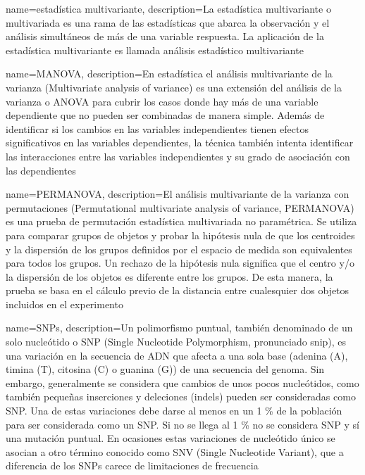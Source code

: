 
\makeglossaries



  {name=estadística multivariante,
   description={La estadística multivariante o multivariada es una rama de las estadísticas que abarca la observación y el análisis simultáneos de más de una variable respuesta. La aplicación de la estadística multivariante es llamada análisis estadístico multivariante}
  }
  
  {name=MANOVA,
   description={En estadística el análisis multivariante de la varianza (Multivariate analysis of variance) es una extensión del análisis de la varianza o ANOVA para cubrir los casos donde hay más de una variable dependiente que no pueden ser combinadas de manera simple. Además de identificar si los cambios en las variables independientes tienen efectos significativos en las variables dependientes, la técnica también intenta identificar las interacciones entre las variables independientes y su grado de asociación con las dependientes}
  }

  {name=PERMANOVA,
   description={El análisis multivariante de la varianza con permutaciones (Permutational multivariate analysis of variance, PERMANOVA) es una prueba de permutación estadística multivariada no paramétrica. Se utiliza para comparar grupos de objetos y probar la hipótesis nula de que los centroides y la dispersión de los grupos definidos por el espacio de medida son equivalentes para todos los grupos. Un rechazo de la hipótesis nula significa que el centro y/o la dispersión de los objetos es diferente entre los grupos. De esta manera, la prueba se basa en el cálculo previo de la distancia entre cualesquier dos objetos incluidos en el experimento}
  }
  
  {name=SNPs,
   description={Un polimorfismo puntual, también denominado de un solo nucleótido o SNP (Single Nucleotide Polymorphism, pronunciado snip), es una variación en la secuencia de ADN que afecta a una sola base (adenina (A), timina (T), citosina (C) o guanina (G)) de una secuencia del genoma. Sin embargo, generalmente se considera que cambios de unos pocos nucleótidos, como también pequeñas inserciones y deleciones (indels) pueden ser consideradas como SNP. Una de estas variaciones debe darse al menos en un 1 \% de la población para ser considerada como un SNP. Si no se llega al 1 \% no se considera SNP y sí una mutación puntual. En ocasiones estas variaciones de nucleótido único se asocian a otro término conocido como SNV (Single Nucleotide Variant), que a diferencia de los SNPs carece de limitaciones de frecuencia}
  }
  
